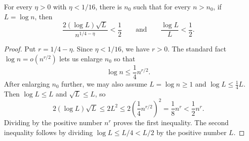 \begin{helper}
For every \(\eta>0\) with \(\eta<1/16\), there is \(n_0\) such that for
every \(n>n_0\), if \(L=\log n\), then
\[
\frac{2(\log L)\sqrt L}{n^{1/4-\eta}}<\frac12
\qquad\text{and}\qquad
\frac{\log L}{L}<\frac12.
\]
\end{helper}
\begin{proof}
Put \(r=1/4-\eta\).  Since \(\eta<1/16\), we have \(r>0\).  The standard
fact \(\log n=o(n^{r/2})\) lets us enlarge \(n_0\) so that
\[
\log n\le \frac14 n^{r/2}.
\]
After enlarging \(n_0\) further, we may also assume \(L=\log n\ge1\) and
\(\log L\le \frac14 L\).  Then \(\log L\le L\) and \(\sqrt L\le L\), so
\[
2(\log L)\sqrt L\le 2L^2
\le 2\left(\frac14 n^{r/2}\right)^2
=\frac18 n^r<\frac12 n^r.
\]
Dividing by the positive number \(n^r\) proves the first inequality.  The
second inequality follows by dividing \(\log L\le L/4<L/2\) by the positive
number \(L\).
\end{proof}

